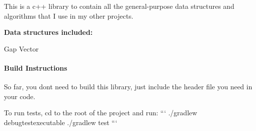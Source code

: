This is a c++ library to contain all the general-\/purpose data structures and algorithms that I use in my other projects.

{\bfseries Data structures included\+:}


\begin{DoxyItemize}
\item Gap Vector
\end{DoxyItemize}

\paragraph*{Build Instructions}

So far, you don\textquotesingle{}t need to build this library, just include the header file you need in your code.

To run tests, cd to the root of the project and run\+: ``` ./gradlew debugtestexecutable ./gradlew test ``` 